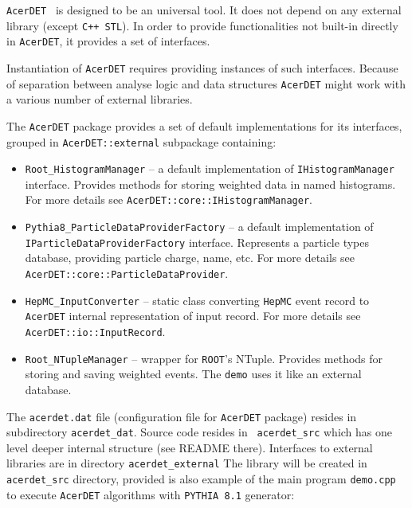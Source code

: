 {\tt AcerDET } is designed to be an universal tool. It does not depend on any external 
library (except {\tt C++ STL}). In order to provide functionalities not built-in directly 
in {\tt AcerDET}, it provides a set of interfaces.

Instantiation of {\tt AcerDET} requires providing instances of such interfaces. Because of 
separation between analyse logic and data structures {\tt AcerDET} might work with a various 
number of external libraries.

The {\tt AcerDET} package provides a set of default implementations for its interfaces, 
grouped in {\tt AcerDET::external} subpackage containing:
\begin{itemize}

\item {\tt Root\_HistogramManager} -- a default implementation of {\tt IHistogramManager} 
interface. Provides methods for storing weighted data in named histograms. 
For more details see {\tt AcerDET::core::IHistogramManager}.

\item {\tt Pythia8\_ParticleDataProviderFactory} -- a default implementation of 
{\tt IParticleDataProviderFactory} interface. Represents a particle types database, 
providing particle charge, name, etc. For more details see {\tt AcerDET::core::ParticleDataProvider}.

\item {\tt HepMC\_InputConverter} -- static class converting {\tt HepMC} event record 
to {\tt AcerDET} internal representation of input record. For more details see 
{\tt AcerDET::io::InputRecord}.

\item {\tt Root\_NTupleManager} -- wrapper for {\tt ROOT}'s NTuple. Provides methods for 
storing and saving weighted events. The {\tt demo} uses it like an external database.

\end{itemize}

The {\tt acerdet.dat} file (configuration file for {\tt AcerDET} package) resides in
subdirectory {\tt acerdet\_dat}. Source code resides in {\tt
acerdet\_src} which has one level deeper internal structure (see README there). 
Interfaces to external libraries are in directory {\tt acerdet\_external}
The library will be created in {\tt acerdet\_src} directory, provided is also
example of the main program {\tt  demo.cpp} to execute {\tt AcerDET} algorithms
with  {\tt PYTHIA 8.1} generator:

